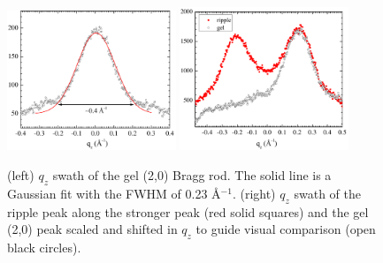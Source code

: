 \begin{figure}[htbp]
  \centering
  \includegraphics[width=0.45\textwidth]{figures/ripple/tWAXS/twaxs_gel_qz}
  \includegraphics[width=0.45\textwidth]{figures/ripple/tWAXS/twaxs_strong_qz}
  \caption[]{(left) $q_z$ swath of the gel (2,0) Bragg rod. The solid line is
  a Gaussian fit with the FWHM of 0.23 \AA$^{-1}$. 
  (right) $q_z$ swath of the ripple peak along the stronger peak 
  (red solid squares) and the gel (2,0) peak scaled and shifted in $q_z$ to guide 
   visual comparison (open black circles).}
  \label{fig:twaxs_gel_qz}
\end{figure}


